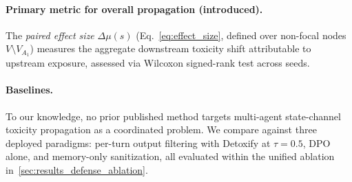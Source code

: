 \paragraph{Primary metric for overall propagation (introduced).}
The \emph{paired effect size} $\Delta\mu(s)$ (Eq.~\eqref{eq:effect_size}, defined over non-focal nodes $V \setminus V_{A_1}$) measures the aggregate downstream toxicity shift attributable to upstream exposure, assessed via Wilcoxon signed-rank test across seeds.


\paragraph{Baselines.}
To our knowledge, no prior published method targets multi-agent state-channel toxicity propagation as a coordinated problem. We compare against three deployed paradigms: per-turn output filtering with Detoxify at $\tau{=}0.5$, DPO alone, and memory-only sanitization, all evaluated within the unified ablation in~\cref{sec:results_defense_ablation}.
 




